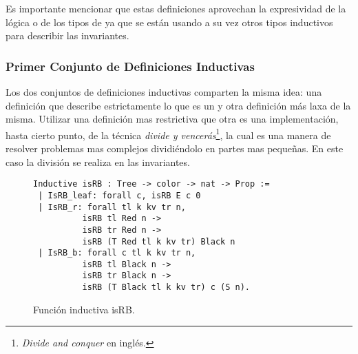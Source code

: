 Es importante mencionar que estas definiciones aprovechan la expresividad de la lógica o de 
los tipos de {\coq} ya que se est\'an usando a su vez otros tipos inductivos para describir las invariantes.

\subsubsection{Primer Conjunto de Definiciones Inductivas}
Los dos conjuntos de definiciones inductivas comparten la misma idea: una definici\'on que describe
estrictamente lo que es un {\arn} y otra definici\'on m\'as laxa de la misma. Utilizar una definici\'on mas restrictiva que otra es una implementaci\'on, hasta cierto punto, de la t\'ecnica \textit{divide y vencerás}\footnote{\textit{Divide and conquer} en ingl\'es.}, la cual es una manera de resolver problemas mas complejos dividiéndolo en partes mas pequeñas. En este caso la división se realiza en las invariantes.

\begin{figure}[!ht]
\centering
\captionsetup{justification=centering}
\begin{verbatim}
Inductive isRB : Tree -> color -> nat -> Prop :=
 | IsRB_leaf: forall c, isRB E c 0
 | IsRB_r: forall tl k kv tr n,
          isRB tl Red n ->
          isRB tr Red n ->
          isRB (T Red tl k kv tr) Black n
 | IsRB_b: forall c tl k kv tr n,
          isRB tl Black n ->
          isRB tr Black n ->
          isRB (T Black tl k kv tr) c (S n).
\end{verbatim}
\caption{Funci\'on inductiva isRB.}
\label{inductive_isRB}
\end{figure}

